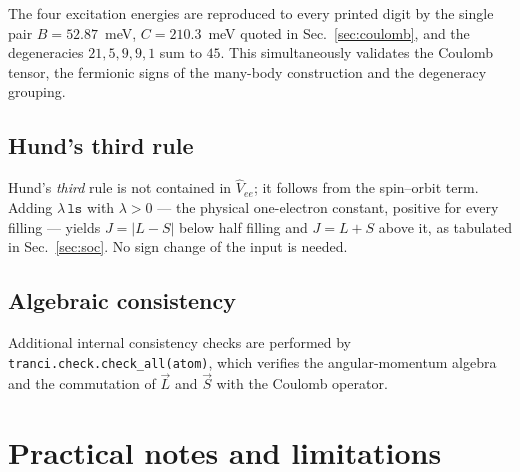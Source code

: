 \documentclass[11pt,a4paper]{article}
\newcommand{\op}[1]{\texttt{#1}}
\begin{document}
\noindent
The four excitation energies are reproduced to every printed digit by the single
pair $B=52.87$~meV, $C=210.3$~meV quoted in Sec.~\ref{sec:coulomb}, and the
degeneracies $21,5,9,9,1$ sum to $45$.  This simultaneously validates the
Coulomb tensor, the fermionic signs of the many-body construction and the
degeneracy grouping.

\subsection{Hund's third rule}

Hund's \emph{third} rule is not contained in $\hat V_{ee}$; it follows from the
spin--orbit term.  Adding $\lambda\,\op{ls}$ with $\lambda>0$ --- the physical
one-electron constant, positive for every filling --- yields $J=|L-S|$ below
half filling and $J=L+S$ above it, as tabulated in Sec.~\ref{sec:soc}.  No sign
change of the input is needed.

\subsection{Algebraic consistency}

Additional internal consistency checks are performed by
\op{tranci.check.check\_all(atom)}, which verifies the angular-momentum algebra
and the commutation of $\vec L$ and $\vec S$ with the Coulomb operator.

\section{Practical notes and limitations}
\end{document}
